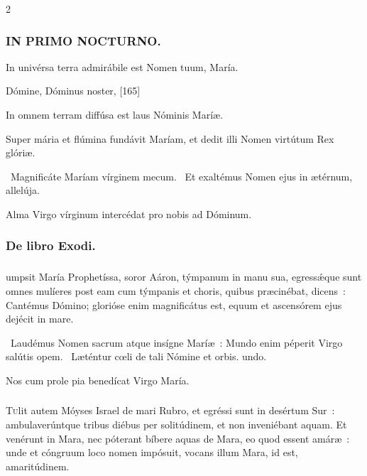 \documentclass[9pt,twoside]{extarticle}
\begin{document}
\begin{multicols}{2}
\subsubsection*{\center \textsc{IN PRIMO NOCTURNO.}}
\begin{tightlist}{}
\item {} In univérsa terra admirábile est Nomen tuum, María.
\item {} Dómine, Dóminus noster,  [165]
\item {} In omnem terram diffúsa est laus Nóminis Maríæ.
\item {} Super mária et flúmina fundávit Maríam, et dedit illi Nomen virtútum Rex glóriæ.
\item {}~Magnificáte Maríam vírginem mecum. ~Et exaltémus Nomen ejus in ætérnum, allelúja.
\item {\small {} Alma Virgo vírginum intercédat pro nobis ad Dóminum.}
\end{tightlist}

\subsubsection*{\center De libro Exodi.}
\subsubsection*{\center {}}
umpsit María Prophetíssa, soror Aáron, týmpanum in manu sua, egressǽque sunt omnes mulíeres post eam cum týmpanis et choris, quibus præcinébat, dicens~: Cantémus Dómino; glorióse enim magnificátus est, equum et ascensórem ejus dejécit in mare.

\begin{tightlist}{}
\item {}~Laudémus Nomen sacrum atque insígne Maríæ~: \textred{*} Mundo enim péperit Virgo salútis opem. ~Læténtur cœli de tali Nómine et orbis. undo.
\item {\small {} Nos cum prole pia benedícat Virgo María.}
\end{tightlist}

\subsubsection*{\center {}}
\lettrine{T}ulit autem Móyses Israel de mari Rubro, et egréssi sunt in desértum Sur~: ambulaverúntque tribus diébus per solitúdinem, et non inveniébant aquam. Et venérunt in Mara, nec póterant bíbere aquas de Mara, eo quod essent amáræ~: unde et cóngruum loco nomen impósuit, vocans illum Mara, id est, amaritúdinem.


\end{multicols}
\end{document}
